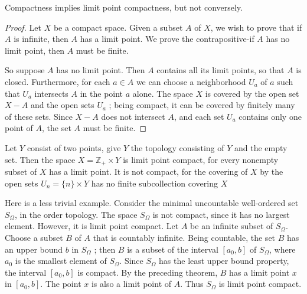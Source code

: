 \begin{theorem}
\label{thm:\thetheorem}
Compactness implies limit point compactness, but not conversely.
\end{theorem}

\begin{proof}
Let \(X\) be a compact space. Given a subset \(A\) of \(X\), we wish to prove that if \(A\) is infinite, then \(A\) has a limit point. We prove the contrapositive-if \(A\) has no limit point, then \(A\) must be finite.

So suppose \(A\) has no limit point. Then \(A\) contains all its limit points, so that \(A\) is closed. Furthermore, for each \(a \in A\) we can choose a neighborhood \(U_{a}\) of \(a\) such that \(U_{a}\) intersects \(A\) in the point \(a\) alone. The space \(X\) is covered by the open set \(X - A\) and the open sets \(U_{a}\) ; being compact, it can be covered by finitely many of these sets. Since \(X - A\) does not intersect \(A\), and each set \(U_{a}\) contains only one point of \(A\), the set \(A\) must be finite.
\end{proof}

\begin{centeredblock}
\begin{example}
\label{ex:\thesection.\theexample}
 Let \(Y\) consist of two points, give \(Y\) the topology consisting of \(Y\) and the empty set. Then the space \(X = \mathbb{Z}_{ + } \times Y\) is limit point compact, for every nonempty subset of \(X\) has a limit point. It is not compact, for the covering of \(X\) by the open sets \(U_{n} = \{ n\} \times Y\) has no finite subcollection covering \(X\)
\end{example}
\end{centeredblock}

\begin{centeredblock}
\begin{example}
\label{ex:\thesection.\theexample}
 Here is a less trivial example. Consider the minimal uncountable well-ordered set \(S_{\Omega }\), in the order topology. The space \(S_{\Omega }\) is not compact, since it has no largest element. However, it is limit point compact. Let \(A\) be an infinite subset of \(S_{\Omega }\). Choose a subset \(B\) of \(A\) that is countably infinite. Being countable, the set \(B\) has an upper bound \(b\) in \(S_{\Omega }\) ; then \(B\) is a subset of the interval \([ {a_{0},b}]\) of \(S_{\Omega }\), where \(a_{0}\) is the smallest element of \(S_{\Omega }\). Since \(S_{\Omega }\) has the least upper bound property, the interval \([ {a_{0},b}]\) is compact. By the preceding theorem, \(B\) has a limit point \(x\) in \([ {a_{0},b}]\). The point \(x\) is also a limit point of \(A\). Thus \(S_{\Omega }\) is limit point compact.
\end{example}
\end{centeredblock}

